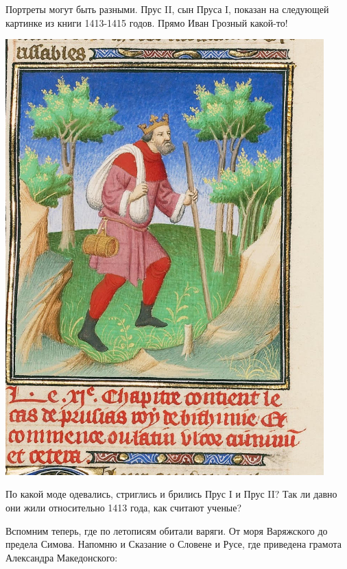 Портреты могут быть разными. Прус II, сын Пруса I, показан на следующей картинке из книги 1413-1415 годов. Прямо Иван Грозный какой-то!

\begin{center}
\includegraphics[width=0.92\textwidth]{chast-troya/kiy-prussia/prus2.jpg}
\end{center}

По какой моде одевались, стриглись и брились Прус I и Прус II? Так ли давно они жили относительно 1413 года, как считают ученые?

Вспомним теперь, где по летописям обитали варяги. От моря Варяжского до предела Симова. Напомню и Сказание о Словене и Русе, где приведена грамота Александра Македонского:

